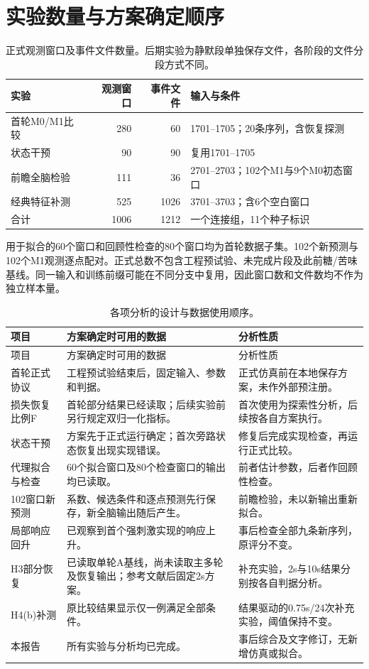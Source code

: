 \section{实验数量与方案确定顺序}
\label{app:ledger}
\begin{table}[!htbp]\centering\small
\caption{正式观测窗口及事件文件数量。后期实验为静默段单独保存文件，各阶段的文件分段方式不同。}
\begin{tabularx}{\linewidth}{L{3.5cm}rrY}\toprule
实验 & 观测窗口 & 事件文件 & 输入与条件\\\midrule
首轮M0/M1比较 & 280 & 60 & 1701--1705；20条序列，含恢复探测\\
状态干预 & 90 & 90 & 复用1701--1705\\
前瞻全脑检验 & 111 & 36 & 2701--2703；102个M1与9个M0初态窗口\\
经典特征补测 & 525 & 1026 & 3701--3703；含6个空白窗口\\\midrule
合计 & 1006 & 1212 & 一个连接组，11个种子标识\\\bottomrule
\end{tabularx}\end{table}

用于拟合的60个窗口和回顾性检查的80个窗口均为首轮数据子集。102个新预测与102个M1观测逐点配对。正式总数不包含工程预试验、未完成片段及此前糖/苦味基线。同一输入和训练前缀可能在不同分支中复用，因此窗口数和文件数均不作为独立样本量。

\begingroup\small
\begin{longtable}{L{3.1cm}L{5.5cm}L{5.8cm}}
\caption{各项分析的设计与数据使用顺序。}\label{tab:chronology}\\
\toprule 项目 & 方案确定时可用的数据 & 分析性质\\\midrule\endfirsthead
\toprule 项目 & 方案确定时可用的数据 & 分析性质\\\midrule\endhead
\bottomrule\endfoot
首轮正式协议 & 工程预试验结束后，固定输入、参数和判据。 & 正式仿真前在本地保存方案，未作外部预注册。\\
损失恢复比例F & 首轮部分结果已经读取；后续实验前另行规定双归一化指标。 & 首次使用为探索性分析，后续按各自方案执行。\\
状态干预 & 方案先于正式运行确定；首次旁路状态恢复出现实现错误。 & 修复后完成实现检查，再运行正式比较。\\
代理拟合与检查 & 60个拟合窗口及80个检查窗口的输出均已读取。 & 前者估计参数，后者作回顾性检查。\\
102窗口新预测 & 系数、候选条件和逐点预测先行保存，新全脑输出随后产生。 & 前瞻检验，未以新输出重新拟合。\\
局部响应回升 & 已观察到首个强刺激实现的响应上升。 & 事后检查全部九条新序列，原评分不变。\\
H3部分恢复 & 已读取单轮A基线，尚未读取主多轮及恢复输出；参考文献后固定2s方案。 & 补充实验，2s与10s结果分别按各自判据分析。\\
H4(b)补测 & 原比较结果显示仅一例满足全部条件。 & 结果驱动的0.75s/24次补充实验，阈值保持不变。\\
本报告 & 所有实验与分析均已完成。 & 事后综合及文字修订，无新增仿真或拟合。\\
\end{longtable}\endgroup

